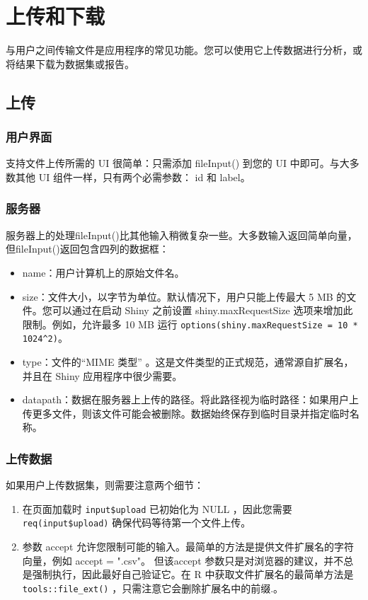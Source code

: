 \chapter{上传和下载\label{ch09}}
与用户之间传输文件是应用程序的常见功能。您可以使用它上传数据进行分析，或将结果下载为数据集或报告。
\section{上传}
\subsection{用户界面}
支持文件上传所需的 UI 很简单：只需添加 fileInput() 到您的 UI 中即可。与大多数其他 UI 组件一样，只有两个必需参数： id 和 label。
\subsection{服务器}
服务器上的处理fileInput()比其他输入稍微复杂一些。大多数输入返回简单向量，但fileInput()返回包含四列的数据框：
\begin{itemize}
    \item name：用户计算机上的原始文件名。
    \item size：文件大小，以字节为单位。默认情况下，用户只能上传最大 5 MB 的文件。您可以通过在启动 Shiny 之前设置 shiny.maxRequestSize 选项来增加此限制。例如，允许最多 10 MB 运行 \verb|options(shiny.maxRequestSize = 10 * 1024^2)|。
    \item type：文件的“MIME 类型” 。这是文件类型的正式规范，通常源自扩展名，并且在 Shiny 应用程序中很少需要。
    \item datapath：数据在服务器上上传的路径。将此路径视为临时路径：如果用户上传更多文件，则该文件可能会被删除。数据始终保存到临时目录并指定临时名称。
\end{itemize}

\subsection{上传数据}
如果用户上传数据集，则需要注意两个细节：
\begin{enumerate}
    \item 在页面加载时 \verb|input$upload| 已初始化为 NULL ，因此您需要 \verb|req(input$upload)| 确保代码等待第一个文件上传。
    \item 参数 accept 允许您限制可能的输入。最简单的方法是提供文件扩展名的字符向量，例如 accept = ".csv"。 但该accept 参数只是对浏览器的建议，并不总是强制执行，因此最好自己验证它。在 R 中获取文件扩展名的最简单方法是 \verb|tools::file_ext()| ，只需注意它会删除扩展名中的前缀.。
\end{enumerate}
